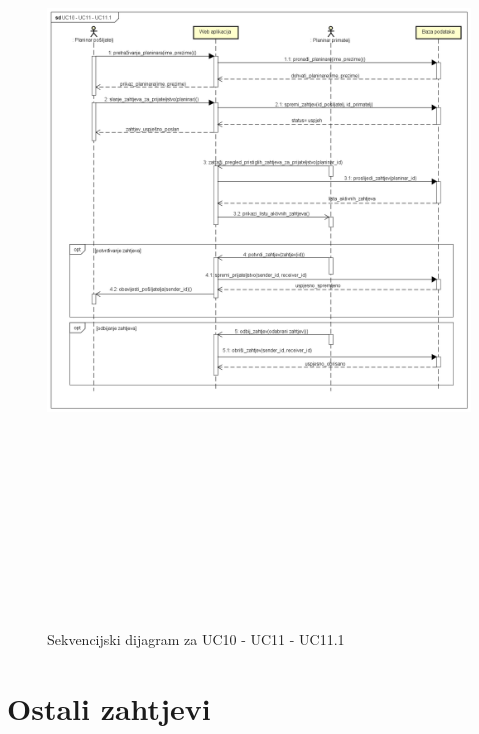 				\begin{figure}[H]
					\includegraphics[scale=1.5, height=220mm, width=165mm]{dijagrami/seq-UC10 - UC11 - UC11.1.png} %
					\centering
					\caption{Sekvencijski dijagram za UC10 - UC11 - UC11.1}
					\label{fig:sekvencijski dijagrami}
				\end{figure}

				\eject
		\section{Ostali zahtjevi}
		

